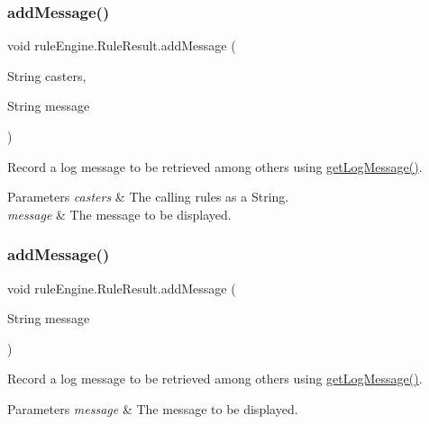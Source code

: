 \subsubsection{\texorpdfstring{add\+Message()}{addMessage()}\hspace{0.1cm}{\footnotesize\ttfamily [2/3]}}
{\footnotesize\ttfamily void rule\+Engine.\+Rule\+Result.\+add\+Message (\begin{DoxyParamCaption}\item[{String}]{casters,  }\item[{String}]{message }\end{DoxyParamCaption})\hspace{0.3cm}{\ttfamily [inline]}}

Record a log message to be retrieved among others using \mbox{\hyperlink{classrule_engine_1_1_rule_result_a25680c11a9156d9052b04a1803f81e9f}{get\+Log\+Message()}}.


\begin{DoxyParams}{Parameters}
{\em casters} & The calling rules as a String. \\
\hline
{\em message} & The message to be displayed. \\
\hline
\end{DoxyParams}
\mbox{\label{classrule_engine_1_1_rule_result_affbfff14b19dddc228fca219967e8d9c}} 
\subsubsection{\texorpdfstring{add\+Message()}{addMessage()}\hspace{0.1cm}{\footnotesize\ttfamily [3/3]}}
{\footnotesize\ttfamily void rule\+Engine.\+Rule\+Result.\+add\+Message (\begin{DoxyParamCaption}\item[{String}]{message }\end{DoxyParamCaption})\hspace{0.3cm}{\ttfamily [inline]}}

Record a log message to be retrieved among others using \mbox{\hyperlink{classrule_engine_1_1_rule_result_a25680c11a9156d9052b04a1803f81e9f}{get\+Log\+Message()}}.


\begin{DoxyParams}{Parameters}
{\em message} & The message to be displayed. \\
\hline
\end{DoxyParams}
\mbox{\label{classrule_engine_1_1_rule_result_a25680c11a9156d9052b04a1803f81e9f}} 
